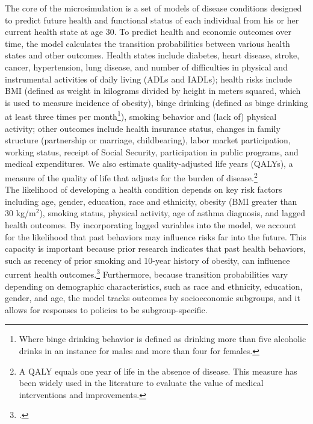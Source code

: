 \noindent The core of the microsimulation is a set of models of disease conditions designed to predict future health and functional status of each individual from his or her current health state at age 30. To predict health and economic outcomes over time, the model calculates the transition probabilities between various health states and other outcomes. Health states include diabetes, heart disease, stroke, cancer, hypertension, lung disease, and number of difficulties in physical and instrumental activities of daily living (ADLs and IADLs); health risks include BMI (defined as weight in kilograms divided by height in meters squared, which is used to measure incidence of obesity), binge drinking (defined as binge drinking at least three times per month\footnote{Where binge drinking behavior is defined as drinking more than five alcoholic drinks in an instance for males and more than four for females.}), smoking behavior and (lack of) physical activity; other outcomes include health insurance status, changes in family structure (partnership or marriage, childbearing), labor market participation, working status, receipt of Social Security, participation in public programs, and medical expenditures. We also estimate quality-adjusted life years (QALYs), a measure of the quality of life that adjusts for the burden of disease.\footnote{A QALY equals one year of life in the absence of disease. This measure has been widely used in the literature to evaluate the value of medical interventions and improvements.} \\

\noindent The likelihood of developing a health condition depends on key risk factors including age, gender, education, race and ethnicity, obesity (BMI greater than 30 kg/m$^2$), smoking status, physical activity, age of asthma diagnosis, and lagged health outcomes. By incorporating lagged variables into the model, we account for the likelihood that past behaviors may influence risks far into the future. This capacity is important because prior research indicates that past health behaviors, such as recency of prior smoking and 10-year history of obesity, can influence current health outcomes.\footnote{\citet{Tong_etal_1996-Lung-Carcinoma,Moore_etal_2008_Past-Body-Mass}.} Furthermore, because transition probabilities vary depending on demographic characteristics, such as race and ethnicity, education, gender, and age, the model tracks outcomes by socioeconomic subgroups, and it allows for responses to policies to be subgroup-specific. \\

